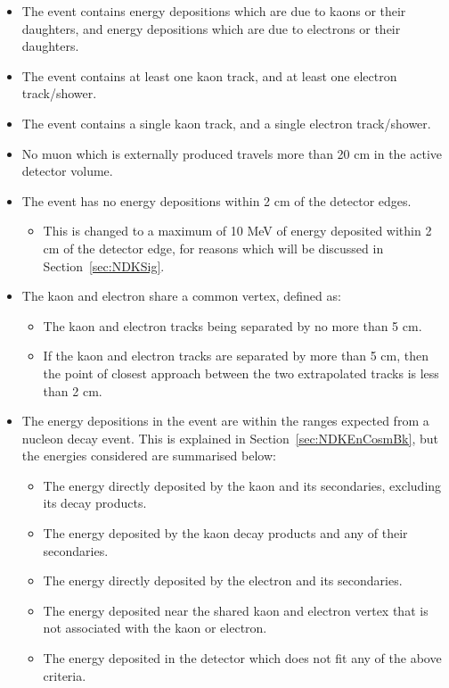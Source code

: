 \begin{itemize}
\item The event contains energy depositions which are due to kaons or their daughters, and energy depositions which are due to electrons or their daughters.
\item The event contains at least one kaon track, and at least one electron track/shower.
\item The event contains a single kaon track, and a single electron track/shower.
\item No muon which is externally produced travels more than 20 cm in the active detector volume.
\item The event has no energy depositions within 2 cm of the detector edges.
  \begin{itemize}
  \item This is changed to a maximum of 10 MeV of energy deposited within 2 cm of the detector edge, for reasons which will be discussed in Section~\ref{sec:NDKSig}.
  \end{itemize}
\item The kaon and electron share a common vertex, defined as:
  \begin{itemize}
  \item The kaon and electron tracks being separated by no more than 5 cm.
  \item If the kaon and electron tracks are separated by more than 5 cm, then the point of closest approach between the two extrapolated tracks is less than 2 cm.
  \end{itemize}
\item The energy depositions in the event are within the ranges expected from a nucleon decay event. This is explained in Section~\ref{sec:NDKEnCosmBk}, but the energies considered are summarised below:
  \begin{itemize}
  \item The energy directly deposited by the kaon and its secondaries, excluding its decay products.
  \item The energy deposited by the kaon decay products and any of their secondaries.
  \item The energy directly deposited by the electron and its secondaries.
  \item The energy deposited near the shared kaon and electron vertex that is not associated with the kaon or electron.
  \item The energy deposited in the detector which does not fit any of the above criteria.
  \end{itemize}
\end{itemize}

